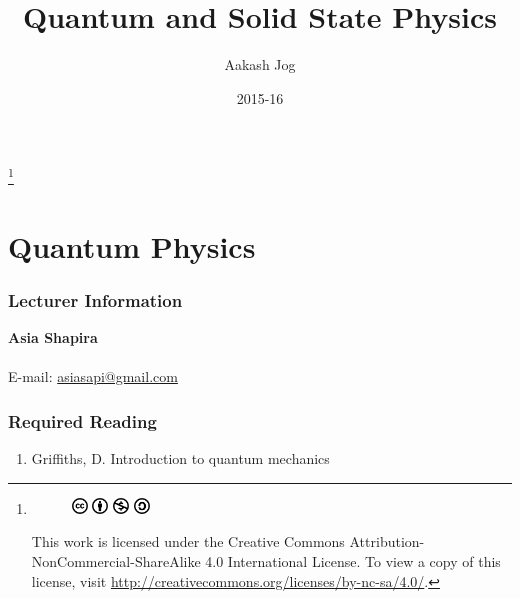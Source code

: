 \documentclass[titlepage, fleqn, a4paper, 12pt, twoside]{article}
\title{Quantum and Solid State Physics}
\author{Aakash Jog}
\date{2015-16}
\theoremstyle{definition}
\theoremstyle{theorem}
\newcommand\blfootnote[1]{%
	\begingroup
	\renewcommand\thefootnote{}\footnote{#1}%
	\addtocounter{footnote}{-1}%
	\endgroup
}
\begin{document}
\maketitle

\blfootnote
{	
	\begin{figure}[H]
		\includegraphics[height = 12pt]{cc.pdf}
		\includegraphics[height = 12pt]{by.pdf}
		\includegraphics[height = 12pt]{nc.pdf}
		\includegraphics[height = 12pt]{sa.pdf}
	\end{figure}
	This work is licensed under the Creative Commons Attribution-NonCommercial-ShareAlike 4.0 International License. To view a copy of this license, visit \url{http://creativecommons.org/licenses/by-nc-sa/4.0/}.
} %

\tableofcontents

\newpage
\listoffigures

\newpage
{}
\part{Quantum Physics}

\section{Lecturer Information}

\textbf{Asia Shapira}\\
~\\
E-mail: \href{mailto:asiasapi@gmail.com}{asiasapi@gmail.com}\\

\section{Required Reading}

\begin{enumerate}
	\item Griffiths, D. Introduction to quantum mechanics
\end{enumerate}
\end{document}
